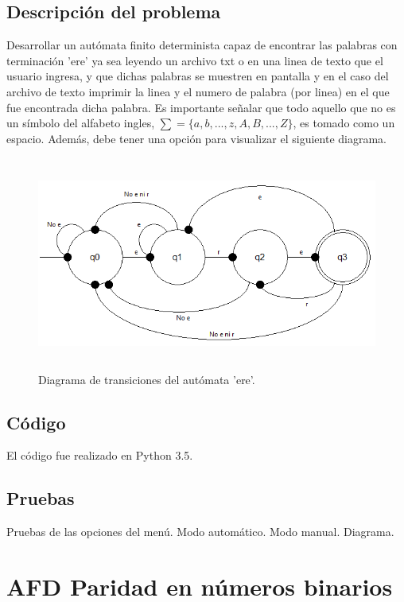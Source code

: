 \documentclass[12pt, titlepage]{article}
\begin{document}
	\subsection{Descripción del problema}
	Desarrollar un autómata finito determinista capaz de encontrar las palabras con terminación 'ere' ya sea leyendo un archivo txt o en una linea de texto que el usuario ingresa, y que dichas palabras se muestren en pantalla y en el caso del archivo de texto imprimir la linea y el numero de palabra (por linea) en el que fue encontrada dicha palabra.
	Es importante señalar que todo aquello que no es un símbolo del alfabeto ingles, $ \sum =\lbrace a, b, ..., z, A, B, ..., Z \rbrace $, es tomado como un espacio. Además, debe tener una opción para visualizar el siguiente diagrama.
	\begin{figure}[ht]
		\begin{center}
		\includegraphics[width=14cm, height=7cm]{img/ere.png}
		\caption{Diagrama de transiciones del autómata 'ere'.}
		\label{fig:diagrama1}
		\end{center}
	\end{figure}
	\subsection{Código}
	El código fue realizado en Python 3.5.
	\subsection{Pruebas}
	Pruebas de las opciones del menú.
	{\large Modo automático.}
	{\large Modo manual.}
	{\large Diagrama.}
	
	\section{AFD Paridad en números binarios}
\end{document}
